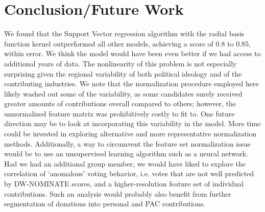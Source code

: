 \documentclass[12]{article}
\begin{document}
\section*{Conclusion/Future Work}

We found that the Support Vector regression algorithm with the radial basis function kernel outperformed all other models, achieving a score of 0.8 to 0.85, within error. We think the model would have been even better if we had access to additional years of data. The nonlinearity of this problem is not especially surprising given the regional variability of both political ideology and of the contributing industries. We note that the normalization procedure employed here likely washed out some of the variability, as some candidates surely received greater amounts of contributions overall compared to others; however, the unnormalized feature matrix was prohibitively costly to fit to. One future direction may be to look at incorporating this variability in the model. More time could be invested in exploring alternative and more representative normalization methods. Additionally, a way to circumvent the feature set normalization issue would be to use an unsupervised learning algorithm such as a neural network.\\

\noindent Had we had an additional group member, we would have liked to explore the correlation of `anomalous' voting behavior, i.e. votes that are not well predicted by DW-NOMINATE scores, and a higher-resolution feature set of individual contributions. Such an analysis would probably also benefit from further segmentation of donations into personal and PAC contributions.\\

\printbibliography
\end{document}
